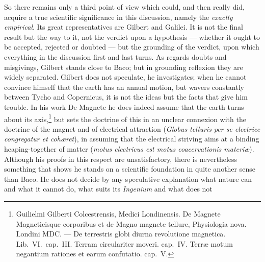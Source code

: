 \documentclass[12pt,a4paper]{book}
\begin{document}
So there remains only a third point of view which could, and then really did, acquire a true scientific
significance in this discussion, namely the \emph{exactly empirical}. Its great representatives are Gilbert
and Galilei. It is not the final result but the way to it, not the verdict upon a hypothesis --- whether it
ought to be accepted, rejected or doubted --- but the grounding of the verdict, upon which everything in the
discussion first and last turns. As regards doubts and misgivings, Gilbert stands close to Baco; but in
grounding reflexion they are widely separated. Gilbert does not speculate, he investigates; when he cannot
convince himself that the earth has an annual motion, but wavers constantly between Tycho and Copernicus, it
is not the ideas but the facts that give him trouble. In his work De Magnete
he does indeed assume that the earth turns about its axis,\footnote{%
Guilielmi Gilberti Colcestrensis, Medici Londinensis. De Magnete Magneticisque corporibus et de Magno magnete
tellure, Physiologia nova. Londini MDC. --- De terrestris globi diurna revolutione magnetica. Lib.\ VI.\
cap.\ III. Terram circulariter moveri. cap.\ IV. Terræ motum negantium rationes et earum confutatio. cap.\ V.}
but sets the doctrine of this in an unclear connexion with the doctrine of the magnet and of electrical
attraction (\textit{Globus telluris per se electrice congregatur et cohæret}), in assuming that the electrical
striving aims at a binding heaping-together of matter (\textit{motus electricus est motus coacervationis
materiæ}). Although his proofs in this respect are unsatisfactory, there is nevertheless something that shows
he stands on a scientific foundation in quite
another sense than Baco. He does not decide by any speculative explanation what nature can and what it cannot
do, what suits its \emph{Ingenium} and what does not
\end{document}
